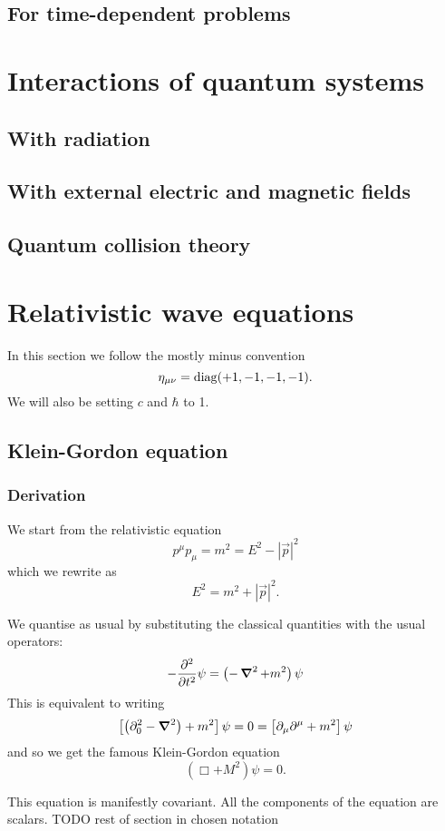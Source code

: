 \section{For time-dependent problems}

\chapter{Interactions of quantum systems}
\section{With radiation}
\section{With external electric and magnetic fields}
\section{Quantum collision theory}


\chapter{Relativistic wave equations}
In this section we follow the mostly minus convention
\[ \eta_{\mu\nu} = \diag(+1,-1,-1,-1). \]
We will also be setting $c$ and $\hbar$ to 1.

\section{Klein-Gordon equation}

\subsection{Derivation}
We start from the relativistic equation
\[ p^\mu p_\mu = m^2 = E^2 - \left|\vec{p}\right|^2 \]
which we rewrite as
\[ E^2 = m^2 + \left|\vec{p}\right|^2. \]

We quantise as usual by substituting the classical quantities with the usual operators:
\[ - \pd[2]{}{t}\psi = \left(-\vnabla^2+m^2\right)\psi \]
This is equivalent to writing
\[ \left[\left(\partial_0^2 - \vnabla^2\right)+m^2\right]\psi = 0 = \left[\partial_\mu\partial^\mu + m^2\right]\psi \]
and so we get the famous Klein-Gordon equation
\[ \boxed{\left(\Box + M^2\right)\psi = 0}. \]

This equation is manifestly covariant. All the components of the equation are scalars.
TODO rest of section in chosen notation


